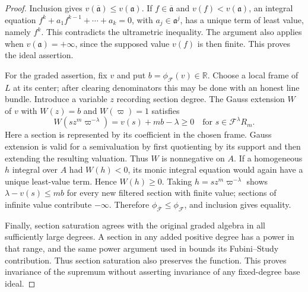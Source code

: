 \begin{proof}
Inclusion gives $v(\overline{\mathfrak a})\leq v(\mathfrak a)$. If $f\in\overline{\mathfrak a}$ and $v(f)<v(\mathfrak a)$, an integral equation $f^k+a_1f^{k-1}+\cdots+a_k=0$, with $a_j\in\mathfrak a^j$, has a unique term of least value, namely $f^k$. This contradicts the ultrametric inequality. The argument also applies when $v(\mathfrak a)=+\infty$, since the supposed value $v(f)$ is then finite. This proves the ideal assertion.

For the graded assertion, fix $v$ and put $b=\phi_{\mathcal F}(v)\in\mathbb R$. Choose a local frame of $L$ at its center; after clearing denominators this may be done with an honest line bundle. Introduce a variable $z$ recording section degree. The Gauss extension $W$ of $v$ with $W(z)=b$ and $W(\varpi)=1$ satisfies
\[
 W(s z^m\varpi^{-\lambda})=v(s)+mb-\lambda\geq0
 \quad\text{for }s\in\mathcal F^\lambda R_m.
\]
Here a section is represented by its coefficient in the chosen frame. Gauss extension is valid for a semivaluation by first quotienting by its support and then extending the resulting valuation. Thus $W$ is nonnegative on $A$. If a homogeneous $h$ integral over $A$ had $W(h)<0$, its monic integral equation would again have a unique least-value term. Hence $W(h)\geq0$. Taking $h=s z^m\varpi^{-\lambda}$ shows $\lambda-v(s)\leq mb$ for every new filtered section with finite value; sections of infinite value contribute $-\infty$. Therefore $\phi_{\overline{\mathcal F}}\leq\phi_{\mathcal F}$, and inclusion gives equality.

Finally, section saturation agrees with the original graded algebra in all sufficiently large degrees. A section in any added positive degree has a power in that range, and the same power argument used in  bounds its Fubini--Study contribution. Thus section saturation also preserves the function. This proves invariance of the supremum without asserting invariance of any fixed-degree base ideal.
\end{proof}

